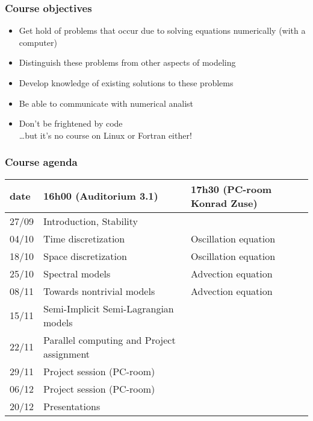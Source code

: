 \documentclass[aspectratio=43,9pt]{beamer}
\begin{document}
%
%
\begin{frame}
	\frametitle{Course objectives}
	\begin{itemize}
		\item Get hold of problems that occur due to solving equations numerically (with a computer)\\[3ex]
\pause
		\item Distinguish these problems from other aspects of modeling
		\item Develop knowledge of existing solutions to these problems
		\item Be able to communicate with numerical analist\\[3ex]
\pause
		\item Don't be frightened by code\\ \quad\ldots but it's no course on Linux or Fortran either!
	\end{itemize}
\end{frame}
%
%
\begin{frame}
	\frametitle{Course agenda}
	\vspace*{-5mm}
	\begin{center}
		\def\arraystretch{1.2}
		\begin{tabular}{lll}
			date	&	16h00 (Auditorium 3.1)	&	17h30 (PC-room Konrad Zuse) \\
		\hline
			27/09 	&	Introduction, Stability	\\
			04/10	&	Time discretization		&	Oscillation equation	\\
			18/10	& 	Space discretization	&	Oscillation equation	\\
			25/10	&	Spectral models			& 	Advection equation 		\\
			08/11	& 	Towards nontrivial models &	Advection equation		\\
			15/11	&	Semi-Implicit Semi-Lagrangian models \\
			22/11	&	Parallel computing and Project assignment \\
			29/11	&	Project session (PC-room)	\\
			06/12	&	Project session (PC-room)	\\
			20/12	&	Presentations
		\end{tabular}
		\def\arraystretch{1}
	\end{center}
\end{frame}
%
\end{document}
